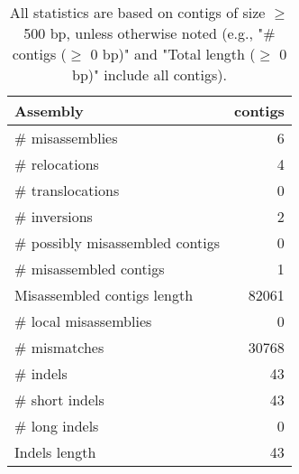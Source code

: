 \documentclass[12pt,a4paper]{article}
\begin{document}
\begin{table}[ht]
\begin{center}
\caption{All statistics are based on contigs of size $\geq$ 500 bp, unless otherwise noted (e.g., "\# contigs ($\geq$ 0 bp)" and "Total length ($\geq$ 0 bp)" include all contigs).}
\begin{tabular}{|l*{1}{|r}|}
\hline
Assembly & contigs \\ \hline
\# misassemblies & 6 \\ \hline
\hspace{5mm}\# relocations & 4 \\ \hline
\hspace{5mm}\# translocations & 0 \\ \hline
\hspace{5mm}\# inversions & 2 \\ \hline
\# possibly misassembled contigs & 0 \\ \hline
\# misassembled contigs & 1 \\ \hline
Misassembled contigs length & 82061 \\ \hline
\# local misassemblies & 0 \\ \hline
\# mismatches & 30768 \\ \hline
\# indels & 43 \\ \hline
\hspace{5mm}\# short indels & 43 \\ \hline
\hspace{5mm}\# long indels & 0 \\ \hline
Indels length & 43 \\ \hline
\end{tabular}
\end{center}
\end{table}
\end{document}
